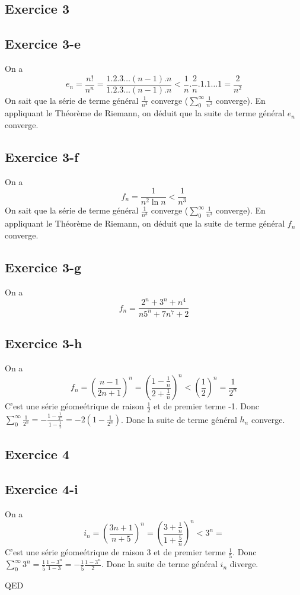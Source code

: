 \documentclass[]{book}
\theoremstyle{definition}
\begin{document}
\newpage
\subsection*{Exercice 3}
\subsection*{Exercice 3-e}
On a 
$$e_n = \frac{n!}{n^n} = \frac{1.2.3 \ldots (n-1).n}{1.2.3 \ldots (n-1).n} < \frac{1}{n}.\frac{2}{n}.1.1\ldots 1 = \frac{2}{n^2}$$
On sait que la s\'erie de terme g\'en\'eral $\frac{1}{n^2}$ converge ($\sum_{0}^{\infty}{\frac{1}{n^2}}$ converge). En appliquant le Th\'eor\`eme de Riemann, on d\'eduit que la suite de terme g\'en\'eral $e_n$ converge.

\subsection*{Exercice 3-f}
On a 
$$f_n = \frac{1}{n^2 \ln n} < \frac{1}{n^3}$$
On sait que la s\'erie de terme g\'en\'eral $\frac{1}{n^3}$ converge ($\sum_{0}^{\infty}{\frac{1}{n^3}}$ converge). En appliquant le Th\'eor\`eme de Riemann, on d\'eduit que la suite de terme g\'en\'eral $f_n$ converge.

\subsection*{Exercice 3-g}
On a 
$$f_n = \frac{2^n+3^n+n^4}{n5^n+7n^7+2}$$

\subsection*{Exercice 3-h}
On a 
$$f_n = \left( \frac{n-1}{2n+1} \right)^n = \left( \frac{1-\frac{1}{n}}{2+\frac{1}{n}} \right)^n < \left( \frac{1}{2} \right)^n = \frac{1}{2^n}$$
C'est une s\'erie g\'eome\'etrique de raison $\frac{1}{2}$ et de premier terme -1. Donc $\sum_{0}^{\infty}\frac{1}{2^n} = -\frac{1-\frac{1}{2^n}}{1-\frac{1}{2}} = -2(1-\frac{1}{2^n})$. Donc la suite de terme g\'en\'eral $h_n$ converge.

\subsection*{Exercice 4}
\subsection*{Exercice 4-i}
On a 
$$i_n = \left( \frac{3n+1}{n+5} \right)^n = \left( \frac{3+\frac{1}{n}}{1+\frac{5}{n}} \right)^n < 3^n = $$
C'est une s\'erie g\'eome\'etrique de raison $3$ et de premier terme $\frac{1}{5}$. Donc $\sum_{0}^{\infty} 3^n = \frac{1}{5}\frac{1-3^n}{1-3} = -\frac{1}{5}\frac{1-3^n}{2}$. Donc la suite de terme g\'en\'eral $i_n$ diverge.


QED
\end{document}
